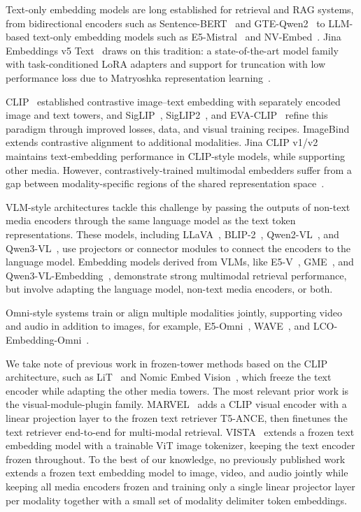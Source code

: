 Text-only embedding models are long established for retrieval and RAG systems, from bidirectional encoders such as Sentence-BERT~\cite{sentence-bert} and GTE-Qwen2~\cite{gte-qwen2} to LLM-based text-only embedding models such as E5-Mistral~\cite{e5-mistral} and NV-Embed~\cite{nv-embed}.
Jina Embeddings v5 Text~\cite{jina-v5-text} draws on this tradition: a state-of-the-art model family with task-conditioned LoRA adapters and support for truncation with low performance loss due to Matryoshka representation learning~\cite{matryoshka}.

CLIP~\cite{clip} established contrastive image--text embedding with separately encoded image and text towers, and SigLIP~\cite{siglip}, SigLIP2~\cite{siglip2}, and EVA-CLIP~\cite{eva-clip} refine this paradigm through improved losses, data, and visual training recipes.
ImageBind~\cite{imagebind} extends contrastive alignment to additional modalities.
Jina CLIP v1/v2~\cite{jinaclip-v1,jinaclip-v2} maintains text-embedding performance in CLIP-style models, while supporting other media.
However, contrastively-trained multimodal embedders suffer from a gap between modality-specific regions of the shared representation space~\cite{modality-gap}.

VLM-style architectures tackle this challenge by passing the outputs of non-text media encoders through the same language model as the text token representations. 
These models, including LLaVA~\cite{llava}, BLIP-2~\cite{blip2}, Qwen2-VL~\cite{qwen2-vl}, and Qwen3-VL~\cite{qwen3-vl}, use projectors or connector modules to connect the encoders to the language model.
Embedding models derived from VLMs, like E5-V~\cite{e5-v}, GME~\cite{gme-qwen2-vl}, and Qwen3-VL-Embedding~\cite{qwen3-vl-embedding}, demonstrate strong multimodal retrieval performance, but involve adapting the language model, non-text media encoders, or both.

Omni-style systems train or align multiple modalities jointly, supporting video and audio in addition to images, for example, E5-Omni~\cite{e5-omni}, WAVE~\cite{wave}, and LCO-Embedding-Omni~\cite{lco-embedding}. 

We take note of previous work in frozen-tower methods based on the CLIP architecture, such as LiT~\cite{lit} and Nomic Embed Vision~\cite{nomic-embed-vision}, which freeze the text encoder while adapting the other media towers.
The most relevant prior work is the visual-module-plugin family.
MARVEL~\cite{marvel} adds a CLIP visual encoder with a linear projection layer to the frozen text retriever T5-ANCE, then finetunes the text retriever end-to-end for multi-modal retrieval.
VISTA~\cite{vista} extends a frozen text embedding model with a trainable ViT image tokenizer, keeping the text encoder frozen throughout.
To the best of our knowledge, no previously published work extends a frozen text embedding model to image, video, and audio jointly while keeping all media encoders frozen and training only a single linear projector layer per modality together with a small set of modality delimiter token embeddings.
     